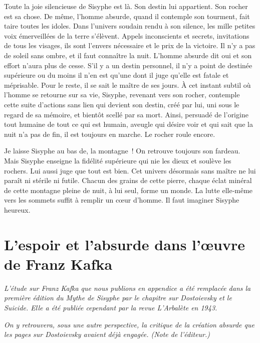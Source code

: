 \documentclass{book}
\begin{document}
Toute la joie silencieuse de Sisyphe est là. Son destin lui appartient. Son rocher est sa chose. De même, l'homme absurde, quand il contemple son tourment, fait taire toutes les idoles. Dans l'univers soudain rendu à son silence, les mille petites voix émerveillées de la terre s'élèvent. Appels inconscients et secrets, invitations de tous les visages, ils sont l'envers nécessaire et le prix de la victoire. Il n'y a pas de soleil sans ombre, et il faut connaître la nuit. L'homme absurde dit oui et son effort n'aura plus de cesse. S'il y a un destin personnel, il n'y a point de destinée supérieure ou du moins il n'en est qu'une dont il juge qu'elle est fatale et méprisable. Pour le reste, il se sait le maître de ses jours. À cet instant subtil où l'homme se retourne sur sa vie, Sisyphe, revenant vers son rocher, contemple cette suite d'actions sans lien qui devient son destin, créé par lui, uni sous le regard de sa mémoire, et bientôt scellé par sa mort. Ainsi, persuadé de l'origine tout humaine de tout ce qui est humain, aveugle qui désire voir et qui sait que la nuit n'a pas de fin, il est toujours en marche. Le rocher roule encore.

Je laisse Sisyphe au bas de, la montagne ! On retrouve toujours son fardeau. Mais Sisyphe enseigne la fidélité supérieure qui nie les dieux et soulève les rochers. Lui aussi juge que tout est bien. Cet univers désormais sans maître ne lui paraît ni stérile ni futile. Chacun des grains de cette pierre, chaque éclat minéral de cette montagne pleine de nuit, à lui seul, forme un monde. La lutte elle‑même vers les sommets suffit à remplir un cœur d'homme. Il faut imaginer Sisyphe heureux.

\backmatter

\chapter{L'espoir et l'absurde dans l'œuvre de Franz Kafka}

\emph{L'étude sur Franz Kafka que nous publions en appendice a été remplacée dans la première édition du Mythe de Sisyphe par le chapitre sur Dostoievsky et le Suicide. Elle a été publiée cependant par la revue L'Arbalète en 1943.}

\emph{On y retrouvera, sous une autre perspective, la critique de la création absurde que les pages sur Dostoievsky avaient déjà engagée. (Note de l'éditeur.)}
\end{document}
